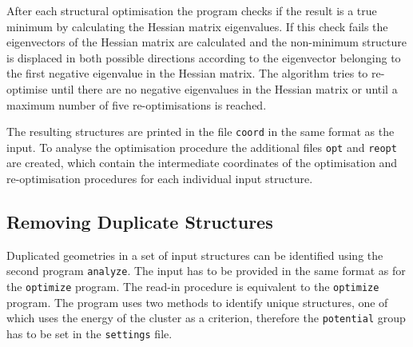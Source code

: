 After each structural optimisation the program checks if the result is a true
minimum by calculating the Hessian matrix eigenvalues. If this check fails the
eigenvectors of the Hessian matrix are calculated and the non-minimum structure
is displaced in both possible directions according to the eigenvector belonging
to the first negative eigenvalue in the Hessian matrix. The algorithm tries to
re-optimise until there are no negative eigenvalues in the Hessian matrix or
until a maximum number of five re-optimisations is reached.

The resulting structures are printed in the file \texttt{coord} in the same
format as the input. To analyse the optimisation procedure the additional files
\texttt{opt} and \texttt{reopt} are created, which contain the intermediate
coordinates of the optimisation and re-optimisation procedures for each individual
input structure.

\subsection{Removing Duplicate Structures}
\label{sec:analysingresults}

Duplicated geometries in a set of input structures can be identified using the
second program \texttt{analyze}. The input has to be provided in the same format
as for the \texttt{optimize} program. The read-in procedure is equivalent to the
\texttt{optimize} program. The program uses two methods to identify unique
structures, one of which uses the energy of the cluster as a criterion,
therefore the \texttt{potential} group has to be set in the \texttt{settings}
file.

